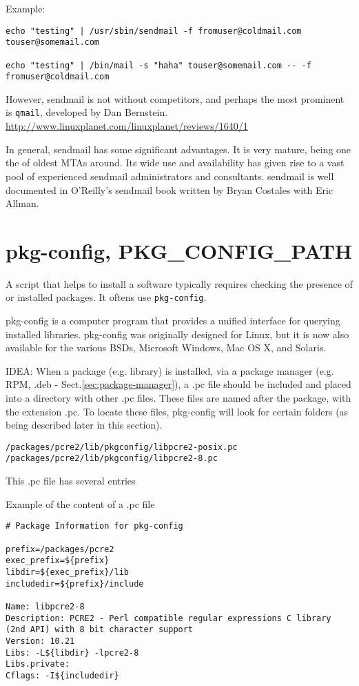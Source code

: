 Example:  
\begin{verbatim}
echo "testing" | /usr/sbin/sendmail -f fromuser@coldmail.com touser@somemail.com

echo "testing" | /bin/mail -s "haha" touser@somemail.com -- -f fromuser@coldmail.com
\end{verbatim}

However, sendmail is not without competitors, and perhaps the most prominent is
\verb!qmail!, developed by Dan Bernstein. 
\url{http://www.linuxplanet.com/linuxplanet/reviews/1640/1}

In general, sendmail has some significant advantages. It is very mature, being
one the of oldest MTAs around. Its wide use and availability has given rise to a
vast pool of experienced sendmail administrators and consultants. sendmail is
well documented in O'Reilly's sendmail book written by Bryan Costales
with Eric Allman.

\section{pkg-config, PKG\_CONFIG\_PATH}
\label{sec:pkg-config}
\label{sec:PKG_CONFIG_PATH-env}


A script that helps to install a software typically requires checking the
presence of or installed packages. It oftens use \verb!pkg-config!.

pkg-config is a computer program that provides a unified interface for querying
installed libraries. pkg-config was originally designed for Linux, but it is now
also available for the various BSDs, Microsoft Windows, Mac OS X, and Solaris.


IDEA: When a package (e.g. library) is installed, via a package manager (e.g.
RPM, .deb - Sect.\ref{sec:package-manager}), a  .pc file should be included and
placed into a directory with other .pc files. 
These files are named after the package, with the extension .pc. To locate these
files, pkg-config will look for certain folders (as being described later in
this section).

\begin{verbatim}
/packages/pcre2/lib/pkgconfig/libpcre2-posix.pc
/packages/pcre2/lib/pkgconfig/libpcre2-8.pc
\end{verbatim}
This .pc file has several entries

Example of the content of a .pc file
\begin{verbatim}
# Package Information for pkg-config

prefix=/packages/pcre2
exec_prefix=${prefix}
libdir=${exec_prefix}/lib
includedir=${prefix}/include

Name: libpcre2-8
Description: PCRE2 - Perl compatible regular expressions C library (2nd API) with 8 bit character support
Version: 10.21
Libs: -L${libdir} -lpcre2-8
Libs.private:  
Cflags: -I${includedir} 
\end{verbatim}

